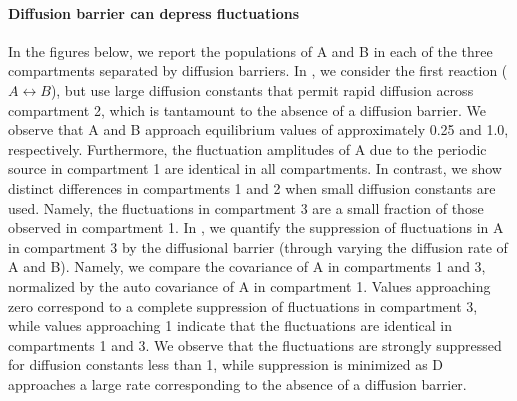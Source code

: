 \paragraph*{Diffusion barrier can depress fluctuations} 
In the figures below, we report the populations of A and B in each of the three compartments separated by diffusion barriers. In , we consider the first reaction ($A \leftrightarrow B$), but use large diffusion constants that permit rapid diffusion across compartment 2, which is tantamount to the absence of a diffusion barrier. We observe that A and B approach equilibrium values of approximately 0.25 and 1.0, respectively. Furthermore, the fluctuation amplitudes of A due to the periodic source in compartment 1 are identical in all compartments. In contrast,   we show distinct differences in compartments 1 and 2 when small diffusion constants are used. Namely, the fluctuations in compartment 3 are a small fraction of those observed in compartment 1. 
In , we quantify the suppression of fluctuations in A in compartment 3 by the diffusional barrier (through varying the diffusion rate of A and B).  
Namely, we compare the covariance of A in compartments 1 and 3, normalized by the auto covariance of A in compartment 1. Values approaching zero correspond to a complete suppression of fluctuations in compartment 3, while values approaching 1 indicate that the fluctuations are identical in compartments 1 and 3. 
We observe that the fluctuations are strongly suppressed for diffusion constants less than 1, while suppression is minimized as D approaches a large rate corresponding to the absence of a diffusion barrier. 

